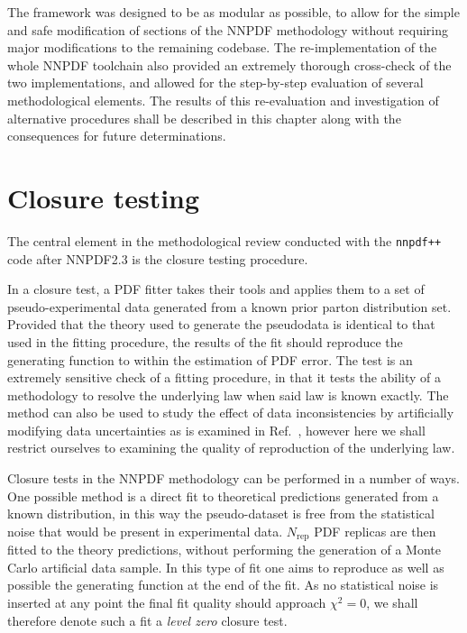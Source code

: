The framework was designed to be as modular as possible, to allow for the simple and safe modification of sections of the NNPDF methodology without requiring major modifications to the remaining codebase. The re-implementation of the whole NNPDF toolchain also provided an extremely thorough cross-check of the two implementations, and allowed for the step-by-step evaluation of several methodological elements. The results of this re-evaluation and investigation of alternative procedures shall be described in this chapter along with the consequences for future determinations.

\section{Closure testing}
\label{sec:closuretest}
The central element in the methodological review conducted with the {\tt nnpdf++} code after NNPDF2.3 is the closure testing procedure.

In a closure test, a PDF fitter takes their tools and applies them to a set of pseudo-experimental data generated from a known prior parton distribution set. Provided that the theory used to generate the pseudodata is identical to that used in the fitting procedure, the results of the fit should reproduce the generating function to within the estimation of PDF error. The test is an extremely sensitive check of a fitting procedure, in that it tests the ability of a methodology to resolve the underlying law when said law is known exactly. The method can also be used to study the effect of data inconsistencies by artificially modifying data uncertainties as is examined in Ref.~\cite{Watt:2012tq}, however here we shall restrict ourselves to examining the quality of reproduction of the underlying law.

Closure tests in the NNPDF methodology can be performed in a number of ways. One possible method is a direct fit to theoretical predictions generated from a known distribution, in this way the pseudo-dataset is free from the statistical noise that would be present in experimental data. $N_{\text{rep}}$ PDF replicas are then fitted to the theory predictions, without performing the generation of a Monte Carlo artificial data sample. In this type of fit one aims to reproduce as well as possible the generating function at the end of the fit. As no statistical noise is inserted at any point the final fit quality should approach $\chi^2=0$, we shall therefore denote such a fit a \emph{level zero} closure test.


